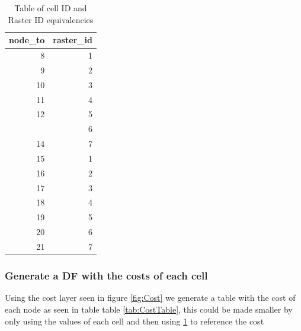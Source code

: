 \documentclass[]{article}
\newenvironment{Shaded}{\begin{snugshade}}{\end{snugshade}}
\newcommand{\DataTypeTok}[1]{\textcolor[rgb]{0.13,0.29,0.53}{#1}}
\newcommand{\DecValTok}[1]{\textcolor[rgb]{0.00,0.00,0.81}{#1}}
\newcommand{\KeywordTok}[1]{\textcolor[rgb]{0.13,0.29,0.53}{\textbf{#1}}}
\newcommand{\NormalTok}[1]{#1}
\newcommand{\OperatorTok}[1]{\textcolor[rgb]{0.81,0.36,0.00}{\textbf{#1}}}
\newcommand{\StringTok}[1]{\textcolor[rgb]{0.31,0.60,0.02}{#1}}
\begin{document}
\begin{table}[!h]

\caption{\label{tab:IDs}Table of cell ID and Raster ID equivalencies}
\centering
\begin{tabular}[t]{rr}
\toprule
node\_to & raster\_id\\
\midrule
\rowcolor{gray!6}  8 & 1\\
9 & 2\\
\rowcolor{gray!6}  10 & 3\\
11 & 4\\
\rowcolor{gray!6}  12 & 5\\
\addlinespace
13 & 6\\
\rowcolor{gray!6}  14 & 7\\
15 & 1\\
\rowcolor{gray!6}  16 & 2\\
17 & 3\\
\addlinespace
\rowcolor{gray!6}  18 & 4\\
19 & 5\\
\rowcolor{gray!6}  20 & 6\\
21 & 7\\
\bottomrule
\end{tabular}
\end{table}

\hypertarget{generate-a-df-with-the-costs-of-each-cell}{%
\subsubsection{Generate a DF with the costs of each cell}\label{generate-a-df-with-the-costs-of-each-cell}}

Using the cost layer seen in figure \ref{fig:Cost} we generate a table with the cost of each node as seen in table table \ref{tab:CostTable}, this could be made smaller by only using the values of each cell and then using \ref{tab:IDs} to reference the cost

\begin{Shaded}
\end{Shaded}
\end{document}
